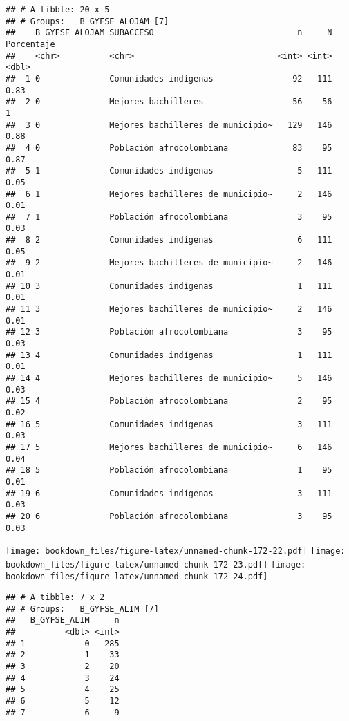 \documentclass[]{article}
\theoremstyle{definition}
\theoremstyle{definition}
\theoremstyle{definition}
\theoremstyle{remark}
\begin{document}
\begin{verbatim}
## # A tibble: 20 x 5
## # Groups:   B_GYFSE_ALOJAM [7]
##    B_GYFSE_ALOJAM SUBACCESO                             n     N Porcentaje
##    <chr>          <chr>                             <int> <int>      <dbl>
##  1 0              Comunidades indígenas                92   111       0.83
##  2 0              Mejores bachilleres                  56    56       1   
##  3 0              Mejores bachilleres de municipio~   129   146       0.88
##  4 0              Población afrocolombiana             83    95       0.87
##  5 1              Comunidades indígenas                 5   111       0.05
##  6 1              Mejores bachilleres de municipio~     2   146       0.01
##  7 1              Población afrocolombiana              3    95       0.03
##  8 2              Comunidades indígenas                 6   111       0.05
##  9 2              Mejores bachilleres de municipio~     2   146       0.01
## 10 3              Comunidades indígenas                 1   111       0.01
## 11 3              Mejores bachilleres de municipio~     2   146       0.01
## 12 3              Población afrocolombiana              3    95       0.03
## 13 4              Comunidades indígenas                 1   111       0.01
## 14 4              Mejores bachilleres de municipio~     5   146       0.03
## 15 4              Población afrocolombiana              2    95       0.02
## 16 5              Comunidades indígenas                 3   111       0.03
## 17 5              Mejores bachilleres de municipio~     6   146       0.04
## 18 5              Población afrocolombiana              1    95       0.01
## 19 6              Comunidades indígenas                 3   111       0.03
## 20 6              Población afrocolombiana              3    95       0.03
\end{verbatim}

\texttt{[image: bookdown\_files/figure-latex/unnamed-chunk-172-22.pdf]}
\texttt{[image: bookdown\_files/figure-latex/unnamed-chunk-172-23.pdf]}
\texttt{[image: bookdown\_files/figure-latex/unnamed-chunk-172-24.pdf]}

\begin{verbatim}
## # A tibble: 7 x 2
## # Groups:   B_GYFSE_ALIM [7]
##   B_GYFSE_ALIM     n
##          <dbl> <int>
## 1            0   285
## 2            1    33
## 3            2    20
## 4            3    24
## 5            4    25
## 6            5    12
## 7            6     9
\end{verbatim}
\end{document}
